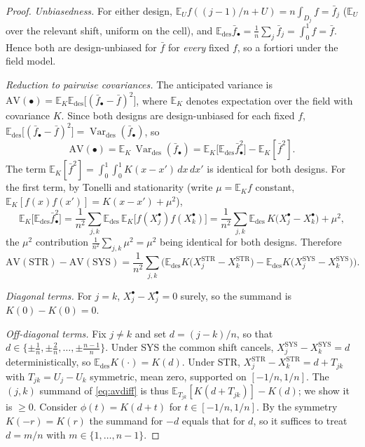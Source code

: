 \documentclass{amsart}
\theoremstyle{definition}
\newcommand{\E}{\mathbb{E}}
\newcommand{\Var}{\operatorname{Var}}
\begin{document}
\begin{proof}
\emph{Unbiasedness.} For either design, $\E_U f((j-1)/n+U)
=n\int_{D_j}f=\bar f_j$ ($\E_U$ over the relevant shift, uniform on the
cell), and $\E_{\mathrm{des}}\bar f_\bullet=\frac1n\sum_j\bar f_j
=\int_0^1 f=\bar f$. Hence both are design-unbiased for $\bar f$ for
\emph{every} fixed $f$, so a fortiori under the field model.

\emph{Reduction to pairwise covariances.} The anticipated variance is
$\mathrm{AV}(\bullet)=\E_K\E_{\mathrm{des}}\big[(\bar f_\bullet-\bar
f)^2\big]$, where $\E_K$ denotes expectation over the field with covariance
$K$. Since both designs are design-unbiased for each fixed $f$,
$\E_{\mathrm{des}}\big[(\bar f_\bullet-\bar f)^2\big]
=\Var_{\mathrm{des}}(\bar f_\bullet)$, so
\[
\mathrm{AV}(\bullet)
=\E_K\,\Var_{\mathrm{des}}(\bar f_\bullet)
=\E_K\Big[\E_{\mathrm{des}}\bar f_\bullet^2\Big]-\E_K[\bar f^2].
\]
The term $\E_K[\bar f^2]=\int_0^1\!\int_0^1 K(x-x')\,dx\,dx'$ is identical
for both designs. For the first term, by Tonelli and stationarity (write
$\mu=\E_K f$ constant, $\E_K[f(x)f(x')]=K(x-x')+\mu^2$),
\[
\E_K\big[\E_{\mathrm{des}}\bar f_\bullet^2\big]
=\frac1{n^2}\sum_{j,k}\E_{\mathrm{des}}\,
\E_K\big[f(X_j^\bullet)f(X_k^\bullet)\big]
=\frac1{n^2}\sum_{j,k}
\E_{\mathrm{des}}\,K\!\big(X_j^\bullet-X_k^\bullet\big)+\mu^2,
\]
the $\mu^2$ contribution $\frac1{n^2}\sum_{j,k}\mu^2=\mu^2$ being identical
for both designs. Therefore
\begin{equation}\label{eq:avdiff}
\mathrm{AV}(\mathrm{STR})-\mathrm{AV}(\mathrm{SYS})
=\frac1{n^2}\sum_{j,k}
\Big(\E_{\mathrm{des}}K\!\big(X_j^{\mathrm{STR}}-X_k^{\mathrm{STR}}\big)
-\E_{\mathrm{des}}K\!\big(X_j^{\mathrm{SYS}}-X_k^{\mathrm{SYS}}\big)\Big).
\end{equation}

\emph{Diagonal terms.} For $j=k$, $X_j^\bullet-X_j^\bullet=0$ surely, so
the summand is $K(0)-K(0)=0$.

\emph{Off-diagonal terms.} Fix $j\ne k$ and set $d=(j-k)/n$, so that
$d\in\{\pm\tfrac1n,\pm\tfrac2n,\dots,\pm\tfrac{n-1}n\}$. Under SYS the common
shift cancels, $X_j^{\mathrm{SYS}}-X_k^{\mathrm{SYS}}=d$ deterministically,
so $\E_{\mathrm{des}}K(\cdot)=K(d)$. Under STR,
$X_j^{\mathrm{STR}}-X_k^{\mathrm{STR}}=d+T_{jk}$ with $T_{jk}=U_j-U_k$
symmetric, mean zero, supported on $[-1/n,1/n]$. The $(j,k)$ summand of
\eqref{eq:avdiff} is thus $\E_{T_{jk}}[K(d+T_{jk})]-K(d)$; we show it is
$\ge0$. Consider $\phi(t)=K(d+t)$ for $t\in[-1/n,1/n]$. By the symmetry
$K(-r)=K(r)$ the summand for $-d$ equals that for $d$, so it suffices to
treat $d=m/n$ with $m\in\{1,\dots,n-1\}$.


\end{proof}
\end{document}
